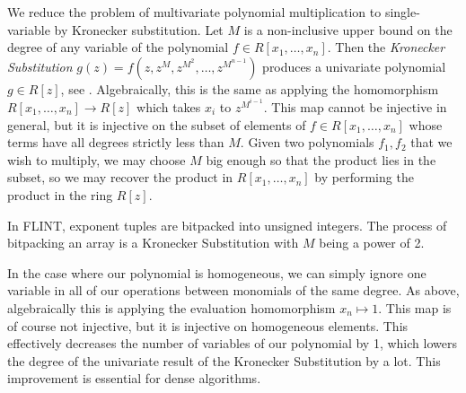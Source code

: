 


We reduce the problem of multivariate polynomial multiplication to single-variable
by Kronecker substitution.
Let $M$ is a non-inclusive upper bound on the degree of any variable of the polynomial
$f \in R[x_1, \dots, x_n]$. 
Then the \textit{Kronecker Substitution} 
\(g(z) = f(z, z^M, z^{M^2}, \dots, z^{M^{n-1}})\)
produces a univariate polynomial $g \in R[z]$,
see \cite{arnold-2014-kronecker}.
Algebraically, this is the same as applying the 
homomorphism 
\(R[x_{1}, \ldots, x_{n}] \xrightarrow{} R[z]\)
which takes \(x_{i}\) to
\(z^{M^{i-1}}\).
This map cannot be injective in general, but it
is injective on the subset of elements of
\(f \in R[x_{1}, \ldots, x_{n}]\) 
whose terms have all degrees strictly less than \(M\).
Given two polynomials \(f_{1}, f_{2}\) that
we wish to multiply, we may choose \(M\)
big enough
so that the product lies in the subset,
so we may recover the product in 
\(R[x_{1}, \ldots, x_{n}]\) by performing
the product in the ring \(R[z]\).

\begin{rmk}
    In FLINT, exponent tuples are bitpacked into unsigned integers. The process of bitpacking an array is a Kronecker Substitution with $M$ being a power of 2.
\end{rmk}

In the case where our polynomial is homogeneous, 
we can simply ignore one variable in all of our operations between monomials of the same degree. 
As above, algebraically this is applying the evaluation
homomorphism \(x_{n} \mapsto 1\).
This map is of course not injective, but it is injective on homogeneous elements.
This effectively decreases the number of variables of our polynomial by 1, 
which lowers the degree of the univariate result of the
Kronecker Substitution by a lot.
This improvement is essential for dense algorithms.

